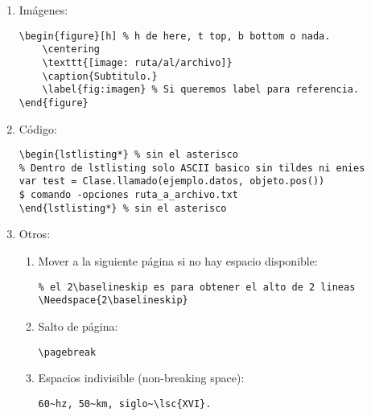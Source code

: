 \begin{enumerate}
\item Imágenes:
\begin{lstlisting}
\begin{figure}[h] % h de here, t top, b bottom o nada.
    \centering
    \texttt{[image: ruta/al/archivo]}
    \caption{Subtitulo.}
    \label{fig:imagen} % Si queremos label para referencia.
\end{figure}
\end{lstlisting}

\item Código:
\begin{lstlisting}
\begin{lstlisting*} % sin el asterisco
% Dentro de lstlisting solo ASCII basico sin tildes ni enies
var test = Clase.llamado(ejemplo.datos, objeto.pos())
$ comando -opciones ruta_a_archivo.txt
\end{lstlisting*} % sin el asterisco
\end{lstlisting}

\item Otros:
\begin{enumerate}
	\item Mover a la siguiente página si no hay espacio disponible:
	\begin{lstlisting}
% el 2\baselineskip es para obtener el alto de 2 lineas
\Needspace{2\baselineskip}
	\end{lstlisting}
	
	\item Salto de página:
	\begin{lstlisting}
\pagebreak
	\end{lstlisting}
	
	\item Espacios indivisible (non-breaking space):
	\begin{lstlisting}
60~hz, 50~km, siglo~\lsc{XVI}.
	\end{lstlisting}
	\lstset{style=bash}
\end{enumerate}

\end{enumerate}